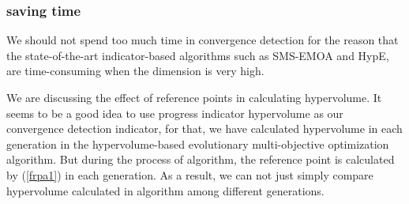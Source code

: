 \documentclass[conference]{IEEEtran}
\begin{document}
\subsubsection{saving time} We should not spend too much time in convergence detection
for the reason that the state-of-the-art indicator-based algorithms such as SMS-EMOA and HypE, 
are time-consuming when the dimension is very high. 

We are discussing the effect of reference points in calculating hypervolume. It seems to be a good
idea to use progress indicator hypervolume as our convergence detection indicator, 
for that, we have calculated 
hypervolume in each generation in the hypervolume-based evolutionary multi-objective optimization algorithm.
But during the process of algorithm, the reference point is calculated by (\ref{frpa1}) 
in each generation.
As a result, we can not just simply compare hypervolume calculated in algorithm among different generations. 
\end{document}
